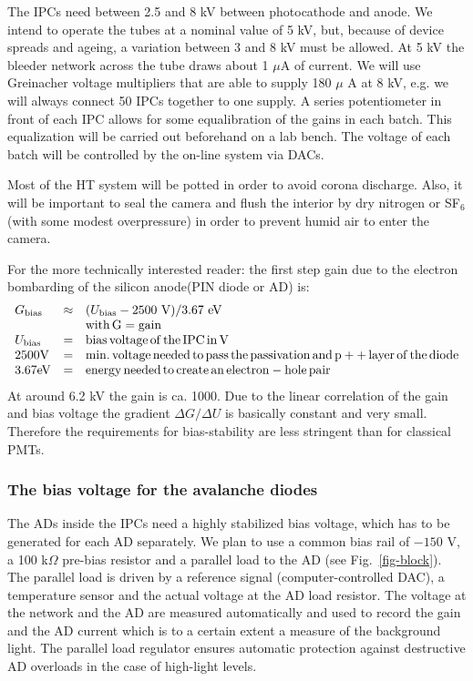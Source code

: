 \medskip The IPCs need between 2.5 and 8 kV between photocathode and anode.
We intend to operate the tubes at a nominal value of 5 kV, but, because of
device spreads and ageing, a variation between 3 and 8 kV must be allowed.
At 5 kV the bleeder network across the tube draws about 1 $\mu$A of current.
We will use Greinacher voltage multipliers that are able to supply 180 $\mu$%
A at 8 kV, e.g. we will always connect 50 IPCs together to one supply. A
series potentiometer in front of each IPC allows for some equalibration of
the gains in each batch. This equalization will be carried out beforehand on
a lab bench. The voltage of each batch will be controlled by the on-line
system via DACs.

Most of the HT system will be potted in order to avoid corona discharge.
Also, it will be important to seal the camera and flush the interior by dry
nitrogen or SF$_6$ (with some modest overpressure) in order to prevent humid
air to enter the camera.

For the more technically interested reader: the first step gain due to the
electron bombarding of the silicon anode(PIN diode or AD) is: 
\[
\begin{array}{lll}
G_{\mathrm{bias}} & \approx & (U_{{\rm bias}}-2500\ {\rm V})/3.67\ {\rm eV} \\ 
&  & \mathrm{with \, G = gain} \\ 
U_{{\rm bias}} & = & \mathrm{bias \, voltage \, of \, the \, IPC \, in \, V} \\ 
2500\mathrm{V} & = & \mathrm{min. \, voltage \, needed \, to \, pass \, the \,
passivation \, and \, p++ \, layer \, of \, the \, diode} \\ 
3.67\mathrm{eV} & = & \mathrm{energy \, needed \, to \, create \, an \, electron-hole \, pair}
\end{array}
\]
At around 6.2 kV the gain is ca. 1000. Due to the linear correlation of the
gain and bias voltage the gradient $\Delta G/\Delta U$ is basically constant
and very small. Therefore the requirements for bias-stability are less
stringent than for classical PMTs.

\subsubsection{The bias voltage for the avalanche diodes}


\medskip The ADs inside the IPCs need a highly stabilized bias voltage,
which has to be generated for each AD separately. We plan to use a common
bias rail of $-150$ V, a 100 k$\Omega$ pre-bias resistor and a parallel load to the
AD (see Fig.~\ref{fig-block}). The parallel load is driven by a reference signal
(computer-controlled DAC), a temperature sensor and the actual voltage at
the AD load resistor. The voltage at the network and the AD are measured
automatically and used to record the gain and the AD current which is to a
certain extent a measure of the background light. The parallel load
regulator ensures automatic protection against destructive AD overloads in
the case of high-light levels.

